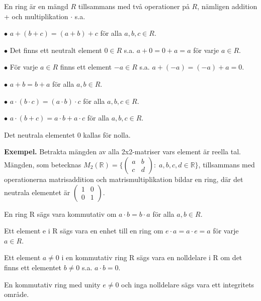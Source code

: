 \begin{definition}
En ring är en mängd $R$ tillsammans med två operationer på $R$, nämligen
addition + och multiplikation $\cdot$ s.a.

$\bullet$ $a+(b+c) = (a+b)+c$ för alla $a,b,c \in R$.

$\bullet$ Det finns ett neutralt element $0 \in R$ s.a. $a+0=0+a=a$ för varje $a \in R$.

$\bullet$ För varje $a \in R$ finns ett element $-a \in R$ s.a. $a + (-a) = (-a) + a = 0$.

$\bullet$ $a + b = b + a$ för alla $a,b \in R$.

$\bullet$ $a \cdot (b \cdot c)=(a \cdot b) \cdot c$ för alla $a,b,c \in R$.

$\bullet$ $a \cdot (b + c) = a \cdot b + a \cdot c$ för alla $a,b,c \in R$.

\noindent
Det neutrala elementet $0$ kallas för nolla.
\end{definition}

\noindent\textbf{Exempel.} Betrakta mängden av alla 2x2-matriser vars element
är reella tal. Mängden, som betecknas
$M_2(\mathbb{R})= \{
\begin{pmatrix}
  a & b\\
  c & d 
\end{pmatrix}
: \; a,b,c,d \in \mathbb{R} \}$, tillsammans med operationerna matrisaddition
och matrismultiplikation bildar en ring, där det neutrala elementet är $
\begin{pmatrix}
 1 & 0 \\
 0 & 1
\end{pmatrix}.
$

\begin{definition}
En ring R sägs vara kommutativ om $a \cdot b = b \cdot a$ för alla $a,b \in R$.
\end{definition}

\begin{definition}
Ett element e i R sägs vara en enhet till en ring om
$e \cdot a = a \cdot e = a$ för varje $a \in R$.
\end{definition}

\begin{definition}
Ett element $a \neq 0$ i en kommutativ ring R sägs vara en nolldelare i R om
det finns ett elementet $b \neq 0$ s.a. $a \cdot b = 0$.
\end{definition}

\begin{definition}
En kommutativ ring med unity $e \neq 0$ och inga nolldelare sägs vara ett
integritets område.
\end{definition}
